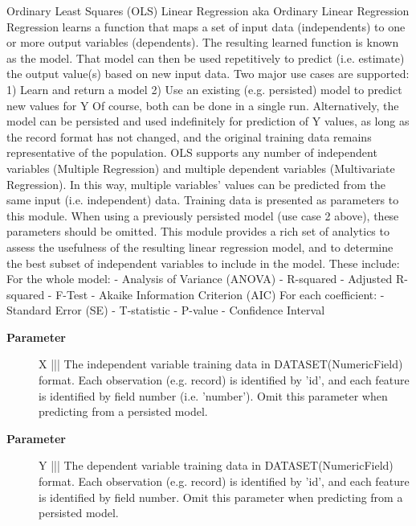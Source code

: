 \par
Ordinary Least Squares (OLS) Linear Regression aka Ordinary Linear Regression Regression learns a function that maps a set of input data (independents) to one or more output variables (dependents). The resulting learned function is known as the model. That model can then be used repetitively to predict (i.e. estimate) the output value(s) based on new input data. Two major use cases are supported: 1) Learn and return a model 2) Use an existing (e.g. persisted) model to predict new values for Y Of course, both can be done in a single run. Alternatively, the model can be persisted and used indefinitely for prediction of Y values, as long as the record format has not changed, and the original training data remains representative of the population. OLS supports any number of independent variables (Multiple Regression) and multiple dependent variables (Multivariate Regression). In this way, multiple variables' values can be predicted from the same input (i.e. independent) data. Training data is presented as parameters to this module. When using a previously persisted model (use case 2 above), these parameters should be omitted. This module provides a rich set of analytics to assess the usefulness of the resulting linear regression model, and to determine the best subset of independent variables to include in the model. These include: For the whole model: - Analysis of Variance (ANOVA) - R-squared - Adjusted R-squared - F-Test - Akaike Information Criterion (AIC) For each coefficient: - Standard Error (SE) - T-statistic - P-value - Confidence Interval

\par
\begin{description}
\item [\textbf{Parameter}] X ||| The independent variable training data in DATASET(NumericField) format. Each observation (e.g. record) is identified by 'id', and each feature is identified by field number (i.e. 'number'). Omit this parameter when predicting from a persisted model.
\item [\textbf{Parameter}] Y ||| The dependent variable training data in DATASET(NumericField) format. Each observation (e.g. record) is identified by 'id', and each feature is identified by field number. Omit this parameter when predicting from a persisted model.
\end{description}


